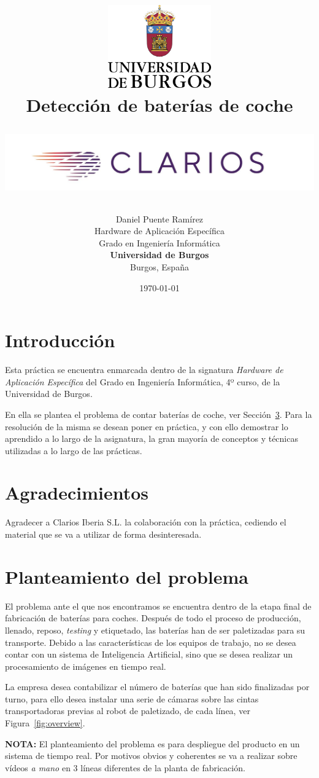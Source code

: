 \documentclass[11pt]{memoir}
\title{
\includegraphics[width=1.75in]{./img/Escudo.PNG} \\
\vspace*{1in}
\Huge\textbf{Detección de baterías de coche} 

\includegraphics[width=\textwidth]{img/Clarios}}
\author{Daniel Puente Ramírez
		\vspace*{1.5in} \\
		Hardware de Aplicación Específica\\
		Grado en Ingeniería Informática\\
        \textbf{Universidad de Burgos}\\
        Burgos, España
       } \date{\today}
\begin{document}
\maketitle
\clearpage
\thispagestyle{empty}
\tableofcontents
\thispagestyle{empty}
\newpage


\section{Introducción}
\setcounter{page}{1}
Esta práctica se encuentra enmarcada dentro de la signatura \textit{Hardware de Aplicación Específica} del Grado en Ingeniería Informática, 4º curso, de la Universidad de Burgos.

En ella se plantea el problema de contar baterías de coche, ver Sección~\ref{sec:problema}. Para la resolución de la misma se desean poner en práctica, y con ello demostrar lo aprendido a lo largo de la asignatura, la gran mayoría de conceptos y técnicas utilizadas a lo largo de las prácticas.

\vspace{5cm}
\section{Agradecimientos}
Agradecer a Clarios Iberia S.L. la colaboración con la práctica, cediendo el material que se va a utilizar de forma desinteresada. 
\newpage
\section{Planteamiento del problema}\label{sec:problema}
El problema ante el que nos encontramos se encuentra dentro de la etapa final de fabricación de baterías para coches. Después de todo el proceso de producción, llenado, reposo, \textit{testing} y etiquetado, las baterías han de ser paletizadas para su transporte. Debido a las características de los equipos de trabajo, no se desea contar con un sistema de Inteligencia Artificial, sino que se desea realizar un procesamiento de imágenes en tiempo real. 

La empresa desea contabilizar el número de baterías que han sido finalizadas por turno, para ello desea instalar una serie de cámaras sobre las cintas transportadoras previas al robot de paletizado, de cada línea, ver Figura~\ref{fig:overview}.

\textbf{NOTA:} El planteamiento del problema es para despliegue del producto en un sistema de tiempo real. Por motivos obvios y coherentes se va a realizar sobre vídeos \textit{a mano} en 3 líneas diferentes de la planta de fabricación. 
\end{document}
